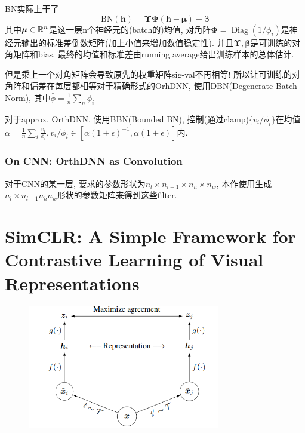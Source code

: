 \documentclass{article}
\begin{document}
BN实际上干了
\begin{equation}
\mathrm{BN}(\boldsymbol{h})=\bm \Upsilon \bm \Phi(\boldsymbol{h}-\boldsymbol{\mu})+\boldsymbol{\beta}
\end{equation}
其中$\bm \mu \in \mathbb{R}^n$是这一层n个神经元的(batch的)均值, 对角阵$\bm \Phi=\operatorname{Diag}(1/\phi_i)$是神经元输出的标准差倒数矩阵(加上小值来增加数值稳定性).
并且$\bm \Upsilon, \bm \beta$是可训练的对角矩阵和bias. 最终的均值和标准差由running average给出训练样本的总体估计.

但是乘上一个对角矩阵会导致原先的权重矩阵sig-val不再相等! 所以让可训练的对角阵和偏差在每层都相等\trarr 对于精确形式的OrhDNN, 使用DBN(Degenerate Batch Norm), 其中$\bar \phi = \frac{1}{n}\sum_n \phi_i$

对于approx. OrthDNN, 使用BBN(Bounded BN), 控制(通过clamp)$\{v_i/\phi_i\}$在均值$\alpha=\frac{1}{n}\sum_i \frac{v_i}{\phi_i}, v_i/\phi_i\in [\alpha(1+\epsilon)^{-1}, \alpha(1+\epsilon)]$内.

\subsubsection{On CNN: OrthDNN as Convolution}

对于CNN的某一层, 要求的参数形状为$n_{l} \times n_{l-1} \times n_{h} \times n_{w}$, 本作使用生成$n_{l} \times n_{l-1}n_{h}n_{w}$形状的参数矩阵来得到这些filter.

\section{SimCLR: A Simple Framework for Contrastive Learning of Visual Representations}

\begin{figure}[htbp]
    \centering
    \includegraphics[width=0.75\textwidth]{simclr-alg.png}
\end{figure}
\end{document}

